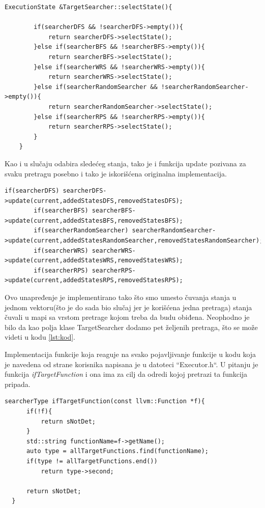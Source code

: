 \documentclass[a4paper]{article}
\begin{document}
\newpage
\begin{lstlisting}[title={Odabir sledećeg stanja}]
    ExecutionState &TargetSearcher::selectState(){

        if(searcherDFS && !searcherDFS->empty()){
            return searcherDFS->selectState();
        }else if(searcherBFS && !searcherBFS->empty()){
            return searcherBFS->selectState();
        }else if(searcherWRS && !searcherWRS->empty()){
            return searcherWRS->selectState();
        }else if(searcherRandomSearcher && !searcherRandomSearcher->empty()){
            return searcherRandomSearcher->selectState();
        }else if(searcherRPS && !searcherRPS->empty()){
            return searcherRPS->selectState();
        }
    }
\end{lstlisting}
Kao i u slučaju odabira sledećeg stanja, tako je i funkcija update pozivana za svaku pretragu posebno i tako je iskorišćena originalna implementacija.
\begin{lstlisting}[title={Update funkcija}]
        if(searcherDFS) searcherDFS->update(current,addedStatesDFS,removedStatesDFS);
        if(searcherBFS) searcherBFS->update(current,addedStatesBFS,removedStatesBFS);
        if(searcherRandomSearcher) searcherRandomSearcher->update(current,addedStatesRandomSearcher,removedStatesRandomSearcher);
        if(searcherWRS) searcherWRS->update(current,addedStatesWRS,removedStatesWRS);
        if(searcherRPS) searcherRPS->update(current,addedStatesRPS,removedStatesRPS);
\end{lstlisting}

Ovo unapređenje je implementirano tako što smo umesto čuvanja stanja u jednom vektoru(što je do sada bio slučaj jer je korišćena jedna pretraga) stanja čuvali u mapi sa vrstom pretrage kojom treba da budu obiđena. Neophodno je bilo da kao polja klase TargetSearcher dodamo pet željenih pretraga, što se može videti u kodu \ref{lst:kod}. 

Implementacija funkcije koja reaguje na svako pojavljivanje funkcije u kodu koja je navedena od strane korisnika napisana je u datoteci ``Executor.h``. U pitanju je funkcija \textit{ifTargetFunction} i ona ima za cilj da odredi kojoj pretrazi ta funkcija pripada.
\begin{lstlisting}[title={Provera kojoj pretrazi funkcija treba da pripada}]
   searcherType ifTargetFunction(const llvm::Function *f){
      if(!f){
		  return sNotDet;
	  }
	  std::string functionName=f->getName();
      auto type = allTargetFunctions.find(functionName);
      if(type != allTargetFunctions.end())
          return type->second;
      
      return sNotDet;
  }
\end{lstlisting}
\end{document}
